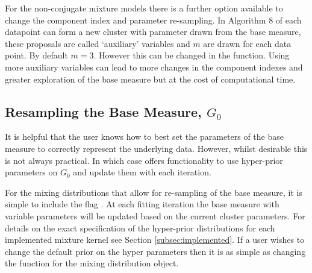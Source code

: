 \documentclass[nojss]{jss}
\begin{document}
For the non-conjugate mixture models there is a further option available to change the component index and parameter re-sampling. In Algorithm 8 of \cite{neal_markov_2000} each datapoint can form a new cluster with parameter drawn from the base measure, these proposals are called `auxiliary' variables and $m$ are drawn for each data point. By default $m=3$. However this can be changed in the  function. Using more auxiliary variables can lead to more changes in the component indexes and greater exploration of the base measure but at the cost of computational time.

\subsection{Resampling the Base Measure, $G_0$}
It is helpful that the user knows how to best set the parameters of the base measure to correctly represent the underlying data. However, whilst desirable this is not always practical. In which case  offers functionality to use hyper-prior parameters on $G_0$ and update them with each iteration.

For the mixing distributions that allow for re-sampling of the base measure, it is simple to include the flag . At each fitting iteration the base measure with variable parameters will be updated based on the current cluster parameters. For details on the exact specification of the hyper-prior distributions for each implemented mixture kernel see Section \ref{subsec:implemented}.  If a user wishes to change the default prior on the hyper parameters then it is as simple as changing the  function for the mixing distribution object.



\end{document}

